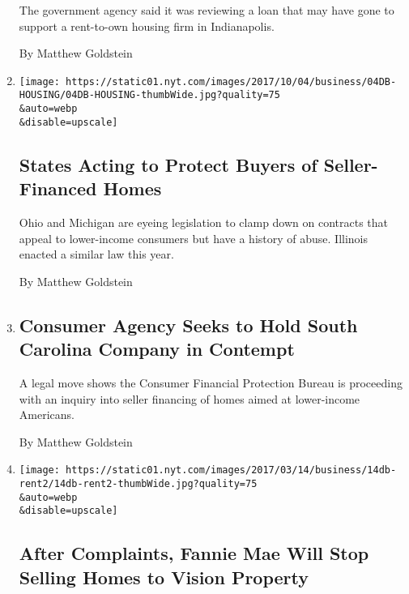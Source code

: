 \begin{enumerate}
  The government agency said it was reviewing a loan that may have gone
  to support a rent-to-own housing firm in Indianapolis.

  By Matthew Goldstein
\item
  \href{/2017/10/03/business/states-acting-to-protect-buyers-of-seller-financed-homes.html}{}

  \texttt{[image: https://static01.nyt.com/images/2017/10/04/business/04DB-HOUSING/04DB-HOUSING-thumbWide.jpg?quality=75\\\&auto=webp\\\&disable=upscale]}

  \hypertarget{states-acting-to-protect-buyers-of-seller-financed-homes}{%
  \subsection{States Acting to Protect Buyers of Seller-Financed
  Homes}\label{states-acting-to-protect-buyers-of-seller-financed-homes}}

  Ohio and Michigan are eyeing legislation to clamp down on contracts
  that appeal to lower-income consumers but have a history of abuse.
  Illinois enacted a similar law this year.

  By Matthew Goldstein
\item
  \href{/2017/06/21/business/consumer-agency-seeks-to-hold-south-carolina-company-in-contempt.html}{}

  \hypertarget{consumer-agency-seeks-to-hold-south-carolina-company-in-contempt}{%
  \subsection{Consumer Agency Seeks to Hold South Carolina Company in
  Contempt}\label{consumer-agency-seeks-to-hold-south-carolina-company-in-contempt}}

  A legal move shows the Consumer Financial Protection Bureau is
  proceeding with an inquiry into seller financing of homes aimed at
  lower-income Americans.

  By Matthew Goldstein
\item
  \href{/2017/05/23/business/dealbook/after-complaints-fannie-mae-will-stop-selling-homes-to-vision-property.html}{}

  \texttt{[image: https://static01.nyt.com/images/2017/03/14/business/14db-rent2/14db-rent2-thumbWide.jpg?quality=75\\\&auto=webp\\\&disable=upscale]}

  \hypertarget{after-complaints-fannie-mae-will-stop-selling-homes-to-vision-property}{%
  \subsection{After Complaints, Fannie Mae Will Stop Selling Homes to
  Vision
  Property}\label{after-complaints-fannie-mae-will-stop-selling-homes-to-vision-property}}


\end{enumerate}

